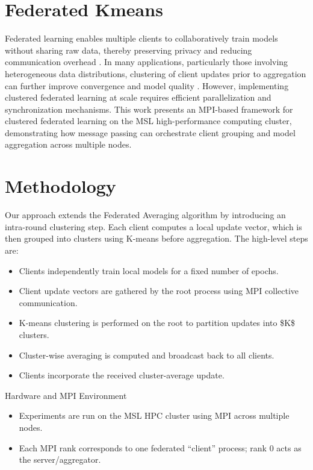 \section{Federated Kmeans}

Federated learning enables multiple clients to collaboratively train models without sharing raw data, thereby preserving privacy and reducing communication overhead \parencite{McMahan2017}. In many applications, particularly those involving heterogeneous data distributions, clustering of client updates prior to aggregation can further improve convergence and model quality \parencite{Ghosh2020}. However, implementing clustered federated learning at scale requires efficient parallelization and synchronization mechanisms. This work presents an MPI-based framework for clustered federated learning on the MSL high-performance computing cluster, demonstrating how message passing can orchestrate client grouping and model aggregation across multiple nodes.

\section{Methodology}
Our approach extends the Federated Averaging algorithm by introducing an intra-round clustering step. Each client computes a local update vector, which is then grouped into clusters using K-means before aggregation. The high-level steps are:
\begin{itemize}
\item Clients independently train local models for a fixed number of epochs.
\item Client update vectors are gathered by the root process using MPI collective communication.
\item K-means clustering is performed on the root to partition updates into \$K\$ clusters.
\item Cluster-wise averaging is computed and broadcast back to all clients.
\item Clients incorporate the received cluster-average update.
\end{itemize}

Hardware and MPI Environment

\begin{itemize}
    \item Experiments are run on the MSL HPC cluster using MPI across multiple nodes. 
    \item Each MPI rank corresponds to one federated “client” process; rank 0 acts as the server/aggregator.
\end{itemize}


